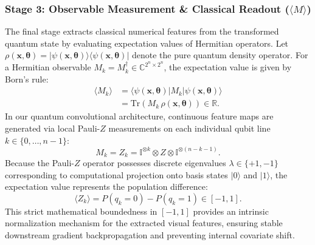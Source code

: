 \documentclass[journal]{IEEEtran}
\begin{document}
\subsubsection{Stage 3: Observable Measurement \& Classical Readout ($\langle M \rangle$)}
The final stage extracts classical numerical features from the transformed quantum state by evaluating expectation values of Hermitian operators. Let $\rho(\mathbf{x}, \boldsymbol{\theta}) = |\psi(\mathbf{x}, \boldsymbol{\theta})\rangle \langle \psi(\mathbf{x}, \boldsymbol{\theta})|$ denote the pure quantum density operator. For a Hermitian observable $M_k = M_k^\dagger \in \mathbb{C}^{2^n \times 2^n}$, the expectation value is given by Born's rule:
\begin{align}
\langle M_k \rangle &= \langle \psi(\mathbf{x}, \boldsymbol{\theta}) | M_k | \psi(\mathbf{x}, \boldsymbol{\theta}) \rangle \nonumber \\
&= \mathrm{Tr}\left( M_k \, \rho(\mathbf{x}, \boldsymbol{\theta}) \right) \in \mathbb{R}.
\label{eq:measurement_born}
\end{align}
In our quantum convolutional architecture, continuous feature maps are generated via local Pauli-$Z$ measurements on each individual qubit line $k \in \{0, \dots, n-1\}$:
\begin{equation}
M_k = Z_k = \mathbb{I}^{\otimes k} \otimes Z \otimes \mathbb{I}^{\otimes (n - k - 1)}.
\label{eq:pauli_z_observable}
\end{equation}
Because the Pauli-$Z$ operator possesses discrete eigenvalues $\lambda \in \{+1, -1\}$ corresponding to computational projection onto basis states $|0\rangle$ and $|1\rangle$, the expectation value represents the population difference:
\begin{equation}
\langle Z_k \rangle = P(q_k = 0) - P(q_k = 1) \in [-1, 1].
\label{eq:pauli_z_bounded}
\end{equation}
This strict mathematical boundedness in $[-1, 1]$ provides an intrinsic normalization mechanism for the extracted visual features, ensuring stable downstream gradient backpropagation and preventing internal covariate shift.
\end{document}
